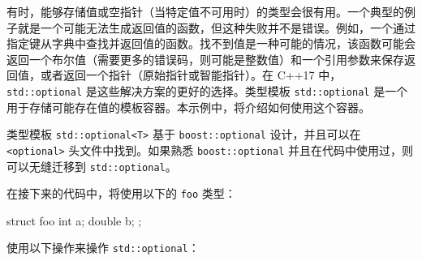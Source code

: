 有时，能够存储值或空指针（当特定值不可用时）的类型会很有用。一个典型的例子就是一个可能无法生成返回值的函数，但这种失败并不是错误。例如，一个通过指定键从字典中查找并返回值的函数。找不到值是一种可能的情况，该函数可能会返回一个布尔值（需要更多的错误码，则可能是整数值）和一个引用参数来保存返回值，或者返回一个指针（原始指针或智能指针）。在 C++17 中，\verb|std::optional| 是这些解决方案的更好的选择。类型模板 \verb|std::optional| 是一个用于存储可能存在值的模板容器。本示例中，将介绍如何使用这个容器。


类型模板 \verb|std::optional<T>| 基于 \verb|boost::optional| 设计，并且可以在 \verb|<optional>| 头文件中找到。如果熟悉 \verb|boost::optional| 并且在代码中使用过，则可以无缝迁移到 \verb|std::optional|。

在接下来的代码中，将使用以下的 \verb|foo| 类型：

\begin{cpp}
struct foo
{
    int    a;
    double b;
};
\end{cpp}


使用以下操作来操作 \verb|std::optional|：

